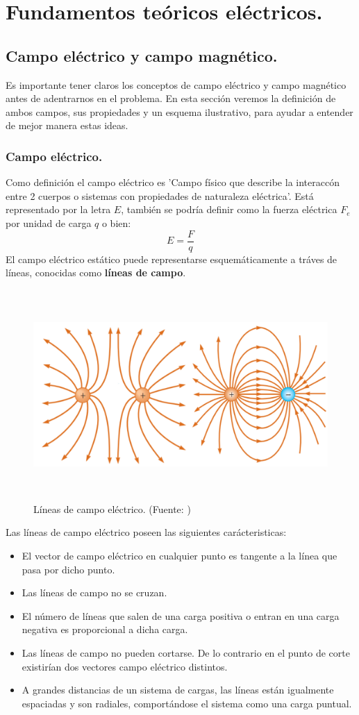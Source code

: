 \chapter{Fundamentos teóricos eléctricos.}
\section{Campo eléctrico y campo magnético.}\label{sec:Campo electrico y campo magnetico.}
\setcounter{equation}{0}
\setcounter{figure}{0}
Es importante tener claros los conceptos de campo eléctrico y campo magnético antes de adentrarnos en el problema. En esta sección veremos la definición de ambos campos, sus propiedades y un esquema ilustrativo, para ayudar a entender de mejor manera estas ideas.
\subsection{Campo eléctrico.}
Como definición el campo eléctrico es 'Campo físico que describe la interaccón entre 2 cuerpos o sistemas con propiedades de naturaleza eléctrica'. Está representado por la letra $E$, también se podría definir como la fuerza eléctrica $F_{e}$  por unidad de carga $q$ o bien:
$$E=\frac{F}{q}$$
El campo eléctrico estático puede representarse esquemáticamente a tráves de líneas, conocidas como \textbf{líneas de campo}.
\begin{figure}[H]
\centering
\includegraphics[height=8cm]{Imagenes/Lineas_de_campo.png}
\caption{Líneas de campo eléctrico. (Fuente: \cite{serway2015fisica})}\label{fig:Lineas de campo electrico}
\end{figure}
Las líneas de campo eléctrico poseen las siguientes carácteristicas:
\begin{itemize}
\item El vector de campo eléctrico en cualquier punto es tangente a la línea que pasa por dicho punto.
\item Las líneas de campo no se cruzan.
\item El número de líneas que salen de una carga positiva o entran en una carga negativa es proporcional a dicha carga.
\item Las líneas de campo no pueden cortarse. De lo contrario en el punto de corte existirían dos vectores campo eléctrico distintos.
\item A grandes distancias de un sistema de cargas, las líneas están igualmente espaciadas y son radiales, comportándose el sistema como una carga puntual.
\end{itemize}
